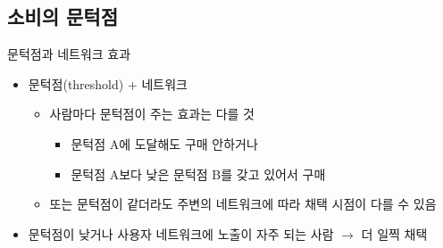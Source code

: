 \documentclass[hyperref={unicode}]{beamer}
\begin{document}
\subsection{소비의 문턱점}
\begin{frame}{문턱점과 네트워크 효과}
\begin{itemize}
\item 문턱점(threshold) $+$ 네트워크
	\begin{itemize}
	\item 사람마다 문턱점이 주는 효과는 다를 것
		\begin{itemize}
		\item 문턱점 A에 도달해도 구매 안하거나
		\item 문턱점 A보다 낮은 문턱점 B를 갖고 있어서 구매
		\end{itemize}
	\item 또는 문턱점이 같더라도 주변의 네트워크에 따라 채택 시점이 다를 수 있음
	\end{itemize}
\item 문턱점이 낮거나 사용자 네트워크에 노출이 자주 되는 사람 $\rightarrow$ 더 일찍 채택	
\end{itemize}
\end{frame}
\end{document}
